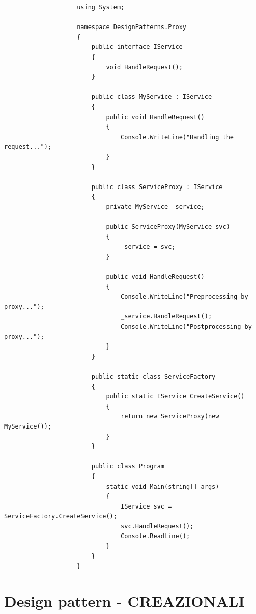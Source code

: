 \documentclass[a4paper,10pt]{article}
\begin{document}
                \begin{lstlisting}
                    using System;

                    namespace DesignPatterns.Proxy
                    {
                        public interface IService
                        {
                            void HandleRequest();
                        }
                    
                        public class MyService : IService
                        {
                            public void HandleRequest()
                            {
                                Console.WriteLine("Handling the request...");
                            }
                        }
                    
                        public class ServiceProxy : IService
                        {
                            private MyService _service;
                    
                            public ServiceProxy(MyService svc)
                            {
                                _service = svc;
                            }
                    
                            public void HandleRequest()
                            {
                                Console.WriteLine("Preprocessing by proxy...");
                                _service.HandleRequest();
                                Console.WriteLine("Postprocessing by proxy...");
                            }
                        }
                    
                        public static class ServiceFactory
                        {
                            public static IService CreateService()
                            {
                                return new ServiceProxy(new MyService());
                            }
                        }
                    
                        public class Program
                        {
                            static void Main(string[] args)
                            {
                                IService svc = ServiceFactory.CreateService();
                                svc.HandleRequest();
                                Console.ReadLine();
                            }
                        }
                    }
                \end{lstlisting}
            \newpage
            \section{Design pattern - CREAZIONALI}
\end{document}
